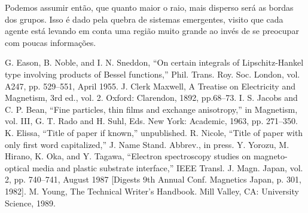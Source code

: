 \documentclass[conference]{IEEEtran}
\begin{document}
Podemos assumir então, que quanto maior o raio, mais disperso será as bordas dos grupos. Isso é dado pela quebra de sistemas emergentes, visito que cada agente está levando em conta uma região muito grande ao invés de se preocupar com poucas informações.

\begin{thebibliography}{00}
 G. Eason, B. Noble, and I. N. Sneddon, ``On certain integrals of Lipschitz-Hankel type involving products of Bessel functions,'' Phil. Trans. Roy. Soc. London, vol. A247, pp. 529--551, April 1955.
 J. Clerk Maxwell, A Treatise on Electricity and Magnetism, 3rd ed., vol. 2. Oxford: Clarendon, 1892, pp.68--73.
 I. S. Jacobs and C. P. Bean, ``Fine particles, thin films and exchange anisotropy,'' in Magnetism, vol. III, G. T. Rado and H. Suhl, Eds. New York: Academic, 1963, pp. 271--350.
 K. Elissa, ``Title of paper if known,'' unpublished.
 R. Nicole, ``Title of paper with only first word capitalized,'' J. Name Stand. Abbrev., in press.
 Y. Yorozu, M. Hirano, K. Oka, and Y. Tagawa, ``Electron spectroscopy studies on magneto-optical media and plastic substrate interface,'' IEEE Transl. J. Magn. Japan, vol. 2, pp. 740--741, August 1987 [Digests 9th Annual Conf. Magnetics Japan, p. 301, 1982].
 M. Young, The Technical Writer's Handbook. Mill Valley, CA: University Science, 1989.
\end{thebibliography}
\end{document}
